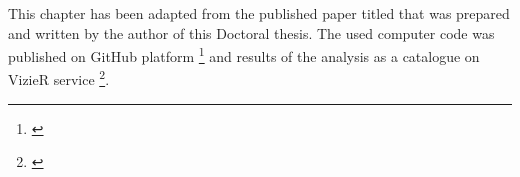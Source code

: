 This chapter has been adapted from the published paper titled \textit{} \citep{} that was prepared and written by the author of this Doctoral thesis. The used computer code was published on GitHub platform \footnote{\url{}} and results of the analysis as a catalogue on VizieR service \footnote{\url{}}.
